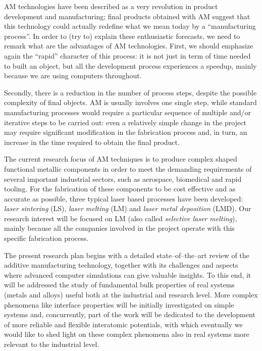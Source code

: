 
AM technologies have been described as a very revolution in product development and manufacturing; final products obtained with AM suggest that this technology could actually redefine what we mean today by a ``manufacturing process''. In order to (try to) explain these enthusiastic forecasts, we need to remark what are the advantages of AM technologies. First, we should emphasize again the ``rapid'' character of this process: it is not just in term of time needed to built an object, but all the development process experiences a speedup, mainly because we are using computers throughout. %

Secondly, there is a reduction in the number of process steps, despite the possible complexity of final objects. AM is usually involves one single step, while standard manufacturing processes would require a particular sequence of multiple and/or iterative steps to be carried out: even a relatively simple change in the project may require significant modification in the fabrication process and, in turn, an increase in the time required to obtain the final product.

The current research focus of AM techniques is to produce complex shaped functional metallic components in order to meet the demanding requirements of several important industrial sectors, such as aerospace, biomedical and rapid tooling.
For the fabrication of these components to be cost effective and as accurate as possible, three typical laser based processes have been developed: \emph{laser sintering} (LS), \emph{laser melting} (LM) and \emph{laser metal deposition} (LMD). Our research interest will be focused on LM (also called \emph{selective laser melting}), mainly because all the companies involved in the project operate with this specific fabrication process.

The present research plan begins with a detailed state--of--the--art review of the additive manufacturing technology, together with its challenges and aspects where advanced computer simulations can give valuable insights. To this end, it will be addressed the study of fundamental bulk properties of real systems (metals and alloys) useful both at the industrial and research level. More complex phenomena like interface properties will be initially investigated on simple systems and, concurrently, part of the work will be dedicated to the development of more reliable and flexible interatomic potentials, with which eventually we would like to shed light on these complex phenomena also in real systems more relevant to the industrial level.












